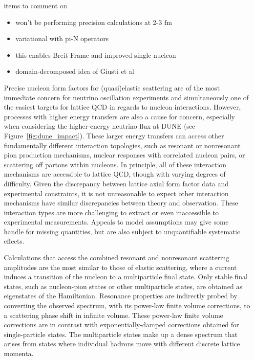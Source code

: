 {\color{red}items to comment on}
\begin{itemize}
\item won't be performing precision calculations at 2-3 fm
\item variational with pi-N operators
\item this enables Breit-Frame and improved single-nucleon
\item domain-decomposed idea of Giusti et al
\end{itemize}


Precise nucleon form factors for (quasi)elastic scattering are of the most immediate concern
 for neutrino oscillation experiments and simultaneously one of the easiest
 targets for lattice QCD in regards to nucleon interactions.
However, processes with higher energy transfers are also a cause for concern,
 especially when considering the higher-energy neutrino flux at DUNE (see Figure~\ref{fig:dune_impact}).
These larger energy transfers can access other fundamentally different interaction topologies,
 such as resonant or nonresonant pion production mechanisms,
 nuclear responses with correlated nucleon pairs,
 or scattering off partons within nucleons.
In principle, all of these interaction mechanisms are accessible to lattice QCD,
 though with varying degrees of difficulty.
Given the discrepancy between lattice axial form factor data and experimental constraints,
 it is not unreasonable to expect other interaction mechanisms have similar discrepancies
 between theory and observation.
These interaction types are more challenging to extract or even inaccessible to
 experimental measurements.
Appeals to model assumptions may give some handle for missing quantities,
 but are also subject to unquantifiable systematic effects.

Calculations that access the combined resonant and nonresonant scattering amplitudes
 are the most similar to those of elastic scattering,
 where a current induces a transition of the nucleon to a multiparticle final state.
Only stable final states, such as nucleon-pion states or other multiparticle states,
 are obtained as eigenstates of the Hamiltonian.
Resonance properties are indirectly probed by converting the observed spectrum,
 with its power-law finite volume corrections, to a scattering phase shift in infinite volume.
These power-law finite volume corrections are in contrast with exponentially-damped
 corrections obtained for single-particle states.
The multiparticle states make up a dense spectrum that arises from
 states where individual hadrons move with different discrete lattice momenta.


